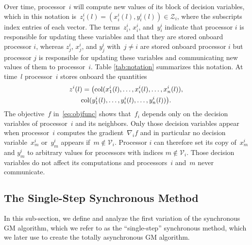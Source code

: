 \documentclass[9pt,shortpaper,twoside,web]{ieeecolor}
\newcommand{\R}{\ensuremath{\mathbb{R}}\xspace}
\newcommand{\X}{\ensuremath{\mathcal{X}}\xspace}
\newcommand{\Z}{\ensuremath{\mathcal{Z}}\xspace}
\newcommand{\V}{\ensuremath{\mathcal{V}}\xspace}
\newcommand{\col}[2]{\textnormal{col}(#1,#2)}
\newcommand{\blue}[1]{{\textcolor{blue}{#1}}}
\begin{document}
Over time, processor~$i$ will compute new values of its
block of decision variables, 
which in this notation is~$z^i_i(l)=(x^i_i(l),y^i_i(l))\in \Z_i$, where %
the subscripts index entries of each vector. 
The terms~$z^i_i$, $x^i_i$, and~$y^i_i$ indicate that processor $i$ is responsible for updating these variables and that they are stored onboard processor $i$, 
whereas $z^i_j$, $x^i_j$, and $y^i_j$ with~$j \neq i$ are stored onboard processor $i$ but processor $j$ is responsible for updating these variables and communicating
new values of them to processor~$i$. 
Table \ref{tab:notation} summarizes this notation.
At time~$l$ processor~$i$ stores onboard the quantities 
\begin{multline}
    z^i(l) = \big( \col{x^i_1(l),\dots,x^i_i(l),\dots}{x^i_n(l)},
    \\ \col{y^i_1(l),\dots,y^i_i(l),\dots}{y^i_n(l)}\big).
\end{multline}
The objective~$f$ in~\eqref{eq:objfunc} shows that~$f_i$
depends only on the decision variables of processor~$i$
and its neighbors. 
Only those decision variables appear
when processor~$i$ computes
the gradient~$\nabla_i f$ and in particular no decision variable~$x^i_m$
or~$y^i_m$ appears if~$m \not\in \V_i$. 
Processor $i$ can therefore set its copy of~$x^i_m$ and $y^i_m$ to arbitrary values for  
processors with indices $m \not\in \V_i$. 
Those decision variables
do not affect its computations and 
processors~$i$ and~$m$ never communicate. 


\subsection{The Single-Step Synchronous Method}
In this sub-section, we define and analyze the first variation of the synchronous GM algorithm, which we refer to as the ``single-step'' 
synchronous method, which we later use to create the totally asynchronous GM algorithm.
\end{document}
